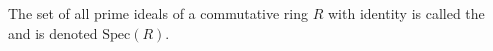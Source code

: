 \documentclass[12pt]{article}
\begin{document}
The set of all prime ideals of a commutative ring $R$ with identity
is called the  and is denoted $\mathrm{Spec}(R)$.
\end{document}
